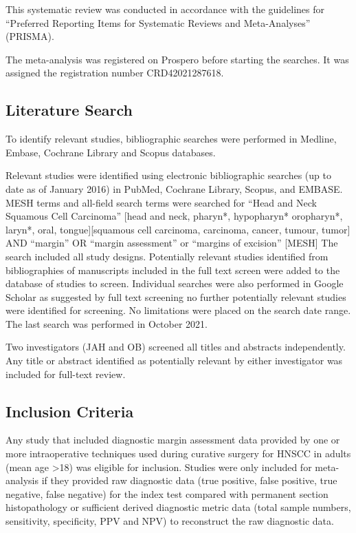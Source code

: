 
This systematic review was conducted in accordance with the guidelines for ``Preferred Reporting Items for Systematic Reviews and Meta-Analyses'' (PRISMA). %



The meta-analysis was registered on Prospero before starting the searches. It was assigned the registration number CRD42021287618.

\subsection{Literature Search}

To identify relevant studies, bibliographic searches were performed in Medline, Embase, Cochrane Library and Scopus databases.

Relevant studies were identified using electronic bibliographic searches (up to date as of January 2016) in PubMed, Cochrane Library, Scopus, and EMBASE. 
MESH terms and all-field search terms were searched for ``Head and Neck Squamous Cell Carcinoma'' [head and neck, pharyn*, hypopharyn* oropharyn*, laryn*, oral, tongue][squamous cell carcinoma, carcinoma, cancer, tumour, tumor] AND ``margin'' OR ``margin assessment'' or ``margins of excision'' [MESH] %
The search included all study designs. 
Potentially relevant studies identified from bibliographies of manuscripts included in the full text screen were added to the database of studies to screen. 
Individual searches were also performed in Google Scholar as suggested by full text screening no further potentially relevant studies were identified for screening. 
No limitations were placed on the search date range. 
The last search was performed in October 2021.


Two investigators (JAH and OB) screened all titles and abstracts independently. Any title or abstract identified as potentially relevant by either investigator was included for full-text review. 


\subsection{Inclusion Criteria}

Any study that included diagnostic margin assessment data provided by one or more intraoperative techniques used during curative surgery for HNSCC in adults (mean age \textgreater 18) was eligible for inclusion.
Studies were only included for meta-analysis if they provided raw diagnostic data (true positive, false positive, true negative, false negative) for the index test compared with permanent section histopathology or sufficient derived diagnostic metric data (total sample numbers, sensitivity, specificity, PPV and NPV) to reconstruct the raw diagnostic data.

